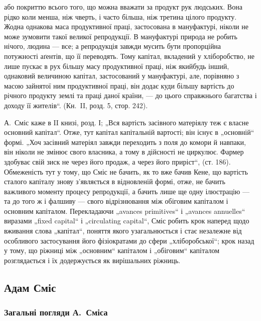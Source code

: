 \parcont{}  %
або покриттю всього того, що можна вважати за продукт рук людських.
Вона рідко коли менша, ніж чверть, і часто більша, ніж третина цілого
продукту. Жодна однакова маса продуктивної праці, застосована в мануфактурі,
ніколи не може зумовити такої великої репродукції. В мануфактурі
природа не робить нічого, людина — все; а репродукція завжди
мусить бути пропорційна потужності аґентів, що її переводять. Тому
капітал, вкладений у хліборобство, не лише пускає в рух більшу масу
продуктивної праці, ніж якийбудь інший, однаковий величиною капітал,
застосований у мануфактурі, але, порівняно з масою зайнятої ним продуктивної
праці, він додає куди більшу вартість до річного продукту
землі та праці даної країни, — до цього справжнього багатства і доходу
її жителів“. (Кн.~II, розд. 5, стор. 242).

А.~Сміс каже в II книзі, розд. І; „Вся вартість засівного матеріялу
теж є власне основний капітал“. Отже, тут капітал \deq{} капітальній вартості;
він існує в „основній“ формі. „Хоч засівний матеріял завжди переходить
з поля до комори й навпаки, він ніколи не змінює свого власника, а тому
в дійсності не циркулює. Фармер здобуває свій зиск не через його продаж,
а через його приріст“, (ст. 186). Обмеженість тут у тому, що Сміс
не бачить, як то вже бачив Кене, що вартість сталого капіталу знову
з’являється в відновленій формі, отже, не бачить важливого моменту
процесу репродукції, а бачить лише ще одну ілюстрацію — та до того ж
і фалшиву — свого відрізнювання між обіговим капіталом і основним
капіталом. Перекладаючи „avances primitives“ і „avances annuelles“
виразами „fixed capital“ і „circulating capital“, Сміс робить крок наперед
щодо вживання слова „капітал“, поняття якого узагальнюється і стає
незалежне від особливого застосування його фізіократами до сфери
„хліборобської“; крок назад у тому, що ріжниці між „основним“ капіталом
і „обіговим“ капіталом розглядається і їх додержується як вирішальних
ріжниць.

\subsection{Адам Сміс}

\subsubsection{Загальні погляди А.~Сміса}

